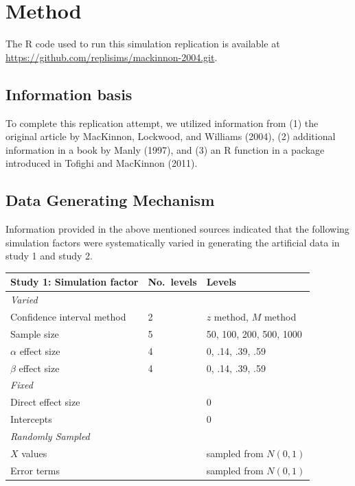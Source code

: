 \documentclass[10,a4paperpaper,]{article}
\begin{document}
\section{Method}

The R code used to run this simulation replication is available at
\url{https://github.com/replisims/mackinnon-2004.git}.

\subsection{Information basis}

To complete this replication attempt, we utilized information from (1)
the original article by MacKinnon, Lockwood, and Williams (2004), (2)
additional information in a book by Manly (1997), and (3) an R function
in a package introduced in Tofighi and MacKinnon (2011).

\subsection{Data Generating Mechanism}

Information provided in the above mentioned sources indicated that the
following simulation factors were systematically varied in generating
the artificial data in study 1 and study 2.

\begin{longtable}[]{@{}lll@{}}
\toprule
Study 1: Simulation factor & No.~levels & Levels \\
\midrule
\endhead
\emph{Varied} & & \\
Confidence interval method & 2 & \(z\) method, \(M\) method \\
Sample size & 5 & 50, 100, 200, 500, 1000 \\
\(\alpha\) effect size & 4 & 0, .14, .39, .59 \\
\(\beta\) effect size & 4 & 0, .14, .39, .59 \\
\emph{Fixed} & & \\
Direct effect size & & 0 \\
Intercepts & & 0 \\
\emph{Randomly Sampled} & & \\
\(X\) values & & sampled from \(N(0,1)\) \\
Error terms & & sampled from \(N(0,1)\) \\
\bottomrule
\end{longtable}
\end{document}
